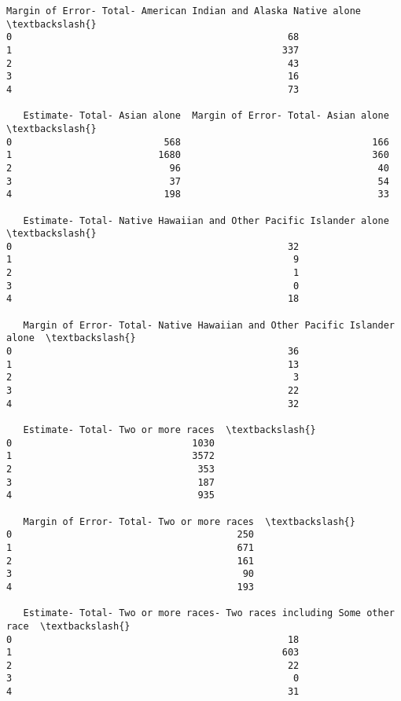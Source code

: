 \documentclass[11pt]{article}
\begin{document}
\begin{tcolorbox}[breakable, size=fbox, boxrule=.5pt, pad at break*=1mm, opacityfill=0]
\begin{Verbatim}[commandchars=\\\{\}]
   Margin of Error- Total- American Indian and Alaska Native alone  \textbackslash{}
0                                                 68
1                                                337
2                                                 43
3                                                 16
4                                                 73

   Estimate- Total- Asian alone  Margin of Error- Total- Asian alone  \textbackslash{}
0                           568                                  166
1                          1680                                  360
2                            96                                   40
3                            37                                   54
4                           198                                   33

   Estimate- Total- Native Hawaiian and Other Pacific Islander alone  \textbackslash{}
0                                                 32
1                                                  9
2                                                  1
3                                                  0
4                                                 18

   Margin of Error- Total- Native Hawaiian and Other Pacific Islander alone  \textbackslash{}
0                                                 36
1                                                 13
2                                                  3
3                                                 22
4                                                 32

   Estimate- Total- Two or more races  \textbackslash{}
0                                1030
1                                3572
2                                 353
3                                 187
4                                 935

   Margin of Error- Total- Two or more races  \textbackslash{}
0                                        250
1                                        671
2                                        161
3                                         90
4                                        193

   Estimate- Total- Two or more races- Two races including Some other race  \textbackslash{}
0                                                 18
1                                                603
2                                                 22
3                                                  0
4                                                 31


\end{Verbatim}
\end{tcolorbox}
\end{document}
